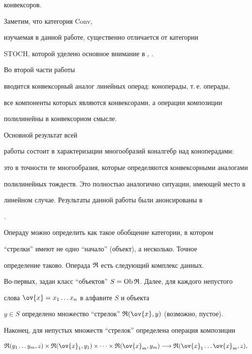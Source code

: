 конвексоров.


Заметим, что категория Conv,


изучаемая в данной работе, существенно отличается от категории


STOCH, которой уделено основное внимание в \cite{Sc1}, \cite{Sc2}.





Во второй части работы


вводится конвексорный аналог линейных операд: коноперады, т.\,е. операды,


все компоненты которых являются конвексорами, а операции композиции


полилинейны в конвексорном смысле.


Основной результат всей


работы состоит в характеризации многообразий коналгебр над коноперадами:


это в точности те многообразия, которые определяются конвексорными аналогами


полилинейных тождеств. Это полностью аналогично ситуации, имеющей место в


линейном случае. Результаты данной работы были анонсированы в


\cite{T4}.





Операду можно определить как такое обобщение категории, в котором


``стрелки'' имеют не одно ``начало'' (объект), а несколько. Точное


определение таково. Операда ${\frak R}$ есть следующий комплекс данных.


Во-первых, задан класс ``объектов'' $S= \operatorname{Ob}{\frak R}$. Далее, для каждого непустого


слова $\ov{x}=x_1\dotsc x_n$ в алфавите $S$ и объекта


$y\in S$ определено множество ``стрелок'' $\R(\ov{x},y)$ (возможно, пустое).


Наконец, для непустых множеств ``стрелок'' определена операция композиции


\begin{equation}


\R(y_1\dotsc y_m,z)\times \R(\ov{x}_1,y_1)\times \dotsb


\times \R(\ov{x}_m,y_m)


\longrightarrow \R(\ov{x}_1\dotsc \ov{x}_m, z),


\end{equation}



